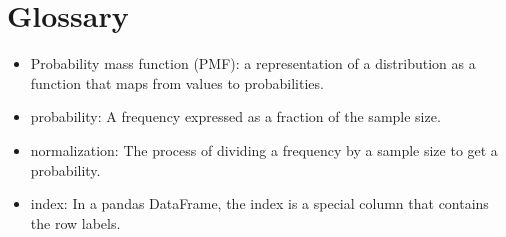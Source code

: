 \section{Glossary}

\begin{itemize}

\item Probability mass function (PMF): a representation of a distribution
as a function that maps from values to probabilities.

\item probability: A frequency expressed as a fraction of the sample
size.

\item normalization: The process of dividing a frequency by a sample
size to get a probability.

\item index: In a pandas DataFrame, the index is a special column
that contains the row labels.

\end{itemize}
